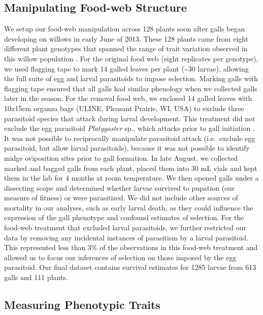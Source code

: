 \documentclass[11pt,]{article}
\begin{document}
\subsection{Manipulating Food-web
Structure}\label{manipulating-food-web-structure}

We setup our food-web manipulation across 128 plants soon after galls
began developing on willows in early June of 2013. These 128 plants came
from eight different plant genotypes that spanned the range of trait
variation observed in this willow population \citep{Barbour2015}. For
the original food web (eight replicates per genotype), we used flagging
tape to mark 14 galled leaves per plant (\textasciitilde{}30 larvae),
allowing the full suite of egg and larval parasitoids to impose
selection. Marking galls with flagging tape ensured that all galls had
similar phenology when we collected galls later in the season. For the
removal food web, we enclosed 14 galled leaves with 10x15cm organza bags
(ULINE, Pleasant Prairie, WI, USA) to exclude three parasitoid species
that attack during larval development. This treatment did not exclude
the egg parasitoid \emph{Platygaster} sp., which attacks prior to gall
initiation \citep[larva initiate gall development in Cecidomyiid
midges:][]{Gagne1989}. It was not possible to reciprocally manipulate
parasitoid attack (i.e.~exclude egg parasitoid, but allow larval
parasitoids), because it was not possible to identify midge oviposition
sites prior to gall formation. In late August, we collected marked and
bagged galls from each plant, placed them into 30 mL vials and kept them
in the lab for 4 months at room temperature. We then opened galls under
a dissecting scope and determined whether larvae survived to pupation
(our measure of fitness) or were parasitized. We did not include other
sources of mortality in our analyses, such as early larval death, as
they could influence the expression of the gall phenotype and confound
estimates of selection. For the food-web treatment that excluded larval
parasitoids, we further restricted our data by removing any incidental
instances of parasitism by a larval parasitoid. This represented less
than 3\% of the observations in this food-web treatment and allowed us
to focus our inferences of selection on those imposed by the egg
parasitoid. Our final dataset contains survival estimates for 1285
larvae from 613 galls and 111 plants.

\subsection{Measuring Phenotypic
Traits}\label{measuring-phenotypic-traits}
\end{document}
